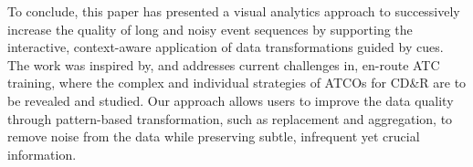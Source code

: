 \documentclass[camera]{vgtc}                          %
\begin{document}
To conclude, this paper has presented a visual analytics approach to successively increase the quality of long and noisy event sequences by supporting the interactive, context-aware application of data transformations guided by cues. The work was inspired by, and addresses current challenges in, en-route ATC training, where the complex and individual strategies of ATCOs for CD\&R are to be revealed and studied. Our approach allows users to improve the data quality through pattern-based transformation, such as replacement and aggregation, to remove noise from the data while preserving subtle, infrequent yet crucial information. 



%
%
%
%


\end{document}
